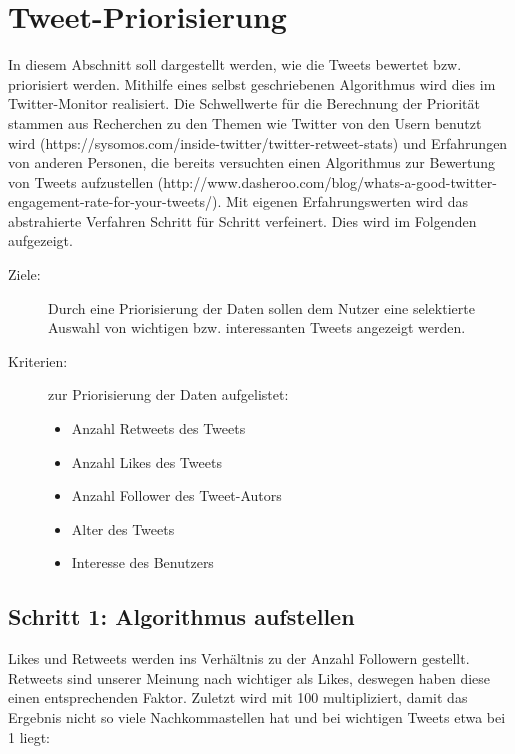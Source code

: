 \section{Tweet-Priorisierung}

In diesem Abschnitt soll dargestellt werden, wie die Tweets bewertet bzw. priorisiert 
werden. Mithilfe eines selbst geschriebenen Algorithmus wird dies im Twitter-Monitor 
realisiert. Die Schwellwerte für die Berechnung der Priorität stammen aus Recherchen zu den Themen wie Twitter von den Usern benutzt wird (https://sysomos.com/inside-twitter/twitter-retweet-stats) und Erfahrungen von anderen Personen, die bereits versuchten einen Algorithmus zur Bewertung von Tweets aufzustellen (http://www.dasheroo.com/blog/whats-a-good-twitter-engagement-rate-for-your-tweets/). Mit eigenen Erfahrungswerten wird das abstrahierte Verfahren Schritt für Schritt verfeinert. Dies wird im Folgenden aufgezeigt.
\begin{description}
	\item [Ziele:] Durch eine Priorisierung der Daten sollen dem Nutzer eine selektierte Auswahl von wichtigen bzw. interessanten Tweets angezeigt werden. 
	\item [Kriterien:] zur Priorisierung der Daten aufgelistet:
	\begin{itemize}
		\item Anzahl Retweets des Tweets 
		\item Anzahl Likes des Tweets
		\item Anzahl Follower des Tweet-Autors
		\item Alter des Tweets
		\item Interesse des Benutzers
	\end{itemize}
\end{description}

\subsection*{Schritt 1: Algorithmus aufstellen}

Likes und Retweets werden ins Verhältnis zu der Anzahl Followern gestellt. Retweets sind 
unserer Meinung nach wichtiger als Likes, deswegen haben diese einen entsprechenden 
Faktor. Zuletzt wird mit 100 multipliziert, damit das Ergebnis nicht so viele 
Nachkommastellen hat und bei wichtigen Tweets etwa bei 1 liegt:

